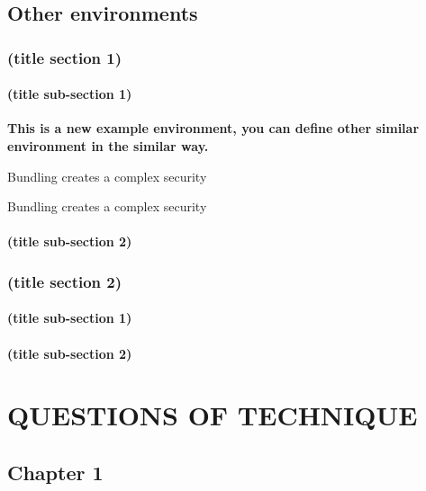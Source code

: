 \lipsum[1]
\lipsum[2-5]

\chapter{Other environments}
\section{(title section 1)}
\subsection{(title sub-section 1)}

\lipsum[9]

\textbf{This is a new example environment, you can define other similar environment in the similar way.}
\begin{example*}
  \wdexpbox
  {\caption{Bundling creates a complex security}}
  {\lipsum[10]}
\end{example*}
\newpage
\lipsum[11]

\begin{example*}
  \wdexpbox
  {\caption{Bundling creates a complex security}}
  {\lipsum[12]}
\end{example*}

\subsection{(title sub-section 2)}
\section{(title section 2)}
\subsection{(title sub-section 1)}
\subsection{(title sub-section 2)}

\partabstractfp{\lipsum[12]}
\partabstractrp{\lipsum[13]}

\part{QUESTIONS OF TECHNIQUE}
\chapter{Chapter 1}
